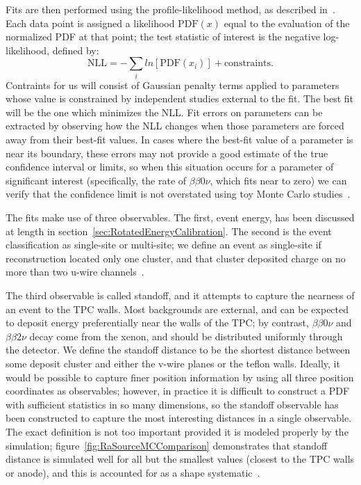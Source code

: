 Fits are then performed using the profile-likelihood method, as described in~\cite{ProfileLikelihood}.  Each data point is assigned a likelihood $\text{PDF}(x)$ equal to the evaluation of the normalized PDF at that point; the test statistic of interest is the negative log-likelihood, defined by:
\begin{equation}
\text{NLL} = -\sum_i ln\left[\text{PDF}(x_i)\right] + \text{constraints}.
\end{equation}
Contraints for us will consist of Gaussian penalty terms applied to parameters whose value is constrained by independent studies external to the fit.  The best fit will be the one which minimizes the NLL.  Fit errors on parameters can be extracted by observing how the NLL changes when those parameters are forced away from their best-fit values.  In cases where the best-fit value of a parameter is near its boundary, these errors may not provide a good estimate of the true confidence interval or limits, so when this situation occurs for a parameter of significant interest (specifically, the rate of $\beta\beta 0\nu$, which fits near to zero) we can verify that the confidence limit is not overstated using toy Monte Carlo studies~\cite{FittingDocument}.

The fits make use of three observables.  The first, event energy, has been discussed at length in section~\ref{sec:RotatedEnergyCalibration}.  The second is the event classification as single-site or multi-site; we define an event as single-site if reconstruction located only one cluster, and that cluster deposited charge on no more than two u-wire channels~\cite{FittingDocument}.

The third observable is called standoff, and it attempts to capture the nearness of an event to the TPC walls.  Most backgrounds are external, and can be expected to deposit energy preferentially near the walls of the TPC; by contrast, $\beta\beta 0\nu$ and $\beta\beta 2\nu$ decay come from the xenon, and should be distributed uniformly through the detector.  We define the standoff distance to be the shortest distance between some deposit cluster and either the v-wire planes or the teflon walls.  Ideally, it would be possible to capture finer position information by using all three position coordinates as observables; however, in practice it is difficult to construct a PDF with sufficient statistics in so many dimensions, so the standoff observable has been constructed to capture the most interesting distances in a single observable.  The exact definition is not too important provided it is modeled properly by the simulation; figure~\ref{fig:RaSourceMCComparison} demonstrates that standoff distance is simulated well for all but the smallest values (closest to the TPC walls or anode), and this is accounted for as a shape systematic~\cite{FittingDocument}.

